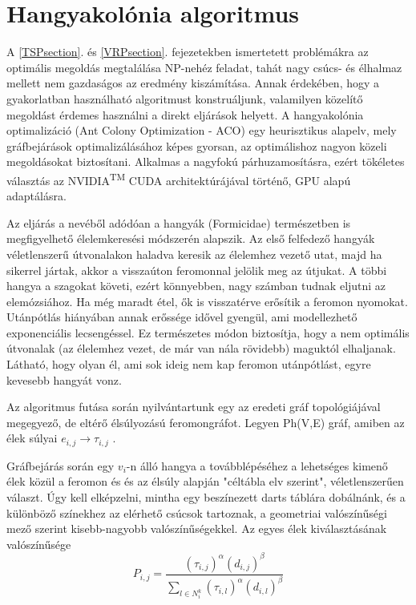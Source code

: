 \section{Hangyakolónia algoritmus \cite{alg_optim}}
A \ref{TSPsection}. és \ref{VRPsection}. fejezetekben ismertetett problémákra az optimális megoldás megtalálása NP-nehéz feladat, tahát nagy csúcs- és élhalmaz mellett nem gazdaságos az eredmény kiszámítása. Annak érdekében, hogy a gyakorlatban használható algoritmust konstruáljunk, valamilyen közelítő megoldást érdemes használni a direkt eljárások helyett. A hangyakolónia optimalizáció (Ant Colony Optimization - ACO) egy heurisztikus alapelv, mely gráfbejárások optimalizálásához képes gyorsan, az optimálishoz nagyon közeli megoldásokat biztosítani. Alkalmas a nagyfokú párhuzamosításra, ezért tökéletes választás az NVIDIA\textsuperscript{TM} CUDA architektúrájával történő, GPU alapú adaptálásra.

Az eljárás a nevéből adódóan a hangyák (Formicidae) természetben is megfigyelhető élelemkeresési módszerén alapszik. Az első felfedező hangyák véletlenszerű útvonalakon haladva keresik az élelemhez vezető utat, majd ha sikerrel jártak, akkor a visszaúton feromonnal jelölik meg az útjukat. A többi hangya a szagokat követi, ezért könnyebben, nagy számban tudnak eljutni az elemózsiához. Ha még maradt étel, ők is visszatérve erősítik a feromon nyomokat. Utánpótlás hiányában annak erőssége idővel gyengül, ami modellezhető exponenciális lecsengéssel. Ez természetes módon biztosítja, hogy a nem optimális útvonalak (az élelemhez vezet, de már van nála rövidebb) maguktól elhaljanak. Látható, hogy olyan él, ami sok ideig nem kap feromon utánpótlást, egyre kevesebb hangyát vonz.

Az algoritmus futása során nyilvántartunk egy az eredeti gráf topológiájával megegyező, de eltérő élsúlyozású feromongráfot. Legyen Ph(V,E) gráf, amiben az élek súlyai \( e_{i,j} \rightarrow \tau_{i,j} \) .

Gráfbejárás során egy \(v_i\)-n álló hangya a továbblépéséhez a lehetséges kimenő élek közül a feromon és és az élsúly alapján "céltábla elv szerint", véletlenszerűen választ. Úgy kell elképzelni, mintha egy beszínezett darts táblára dobálnánk, és a különböző színekhez az elérhető csúcsok tartoznak, a geometriai valószínűségi mező szerint kisebb-nagyobb valószínűségekkel. Az egyes élek kiválasztásának valószínűsége
\begin{equation}
	P_{i,j} = \frac{(\tau_{i,j})^\alpha(d_{i,j})^\beta}{\sum_{l \in N_i^k}(\tau_{i,l})^\alpha(d_{i,l})^\beta }
	\label{ACO_General_probability}
\end{equation}


